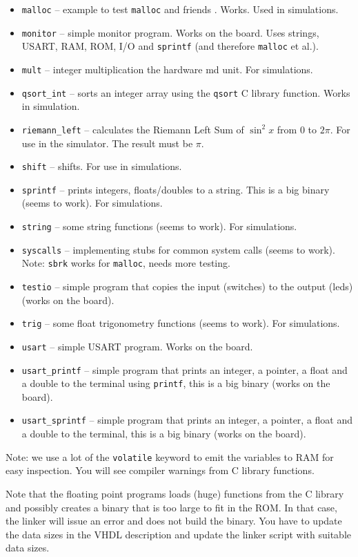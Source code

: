 \documentclass[12pt]{article}
\begin{document}
\begin{itemize}
\item \texttt{malloc} -- example to test \texttt{malloc} and friends . Works. Used in simulations.
\item \texttt{monitor} -- simple monitor program. Works on the board. Uses strings, USART, RAM, ROM, I/O and \texttt{sprintf} (and therefore \texttt{malloc} et al.).
\item \texttt{mult} -- integer multiplication the hardware md unit. For simulations.
\item \texttt{qsort\_int} -- sorts an integer array using the \texttt{qsort} C library function. Works in simulation.
\item \texttt{riemann\_left} -- calculates the Riemann Left Sum of $\sin^2 x$ from $0$ to $2\pi$. For use in the simulator. The  result must be $\pi$.
\item \texttt{shift} -- shifts. For use in simulations.
\item \texttt{sprintf} -- prints integers, floats/doubles to a string. This is a big binary (seems to work). For simulations.
\item \texttt{string} -- some string functions (seems to work). For simulations.
\item \texttt{syscalls} -- implementing stubs for common system calls (seems to work). Note: \texttt{sbrk} works for \texttt{malloc}, needs more testing.
\item \texttt{testio} -- simple program that copies the input (switches) to the output (leds) (works on the board).
\item \texttt{trig} -- some float trigonometry functions (seems to work). For simulations.
\item \texttt{usart} -- simple USART program. Works on the board.
\item \texttt{usart\_printf} -- simple program that prints an integer, a pointer, a float and a double to the terminal using \texttt{printf}, this is a big binary (works on the board).
\item \texttt{usart\_sprintf} -- simple program that prints an integer, a pointer, a float and a double to the terminal, this is a big binary (works on the board).
\end{itemize} 

Note: we use a lot of the \texttt{volatile} keyword to emit the variables to RAM for easy inspection. You will see compiler warnings from C library functions.

Note that the floating point programs loads (huge) functions from the C library and possibly creates a binary that is too large to fit in the ROM. In that case, the linker will issue an error and does not build the binary. You have to update the data sizes in the VHDL description and update the linker script with suitable data sizes.
\end{document}
